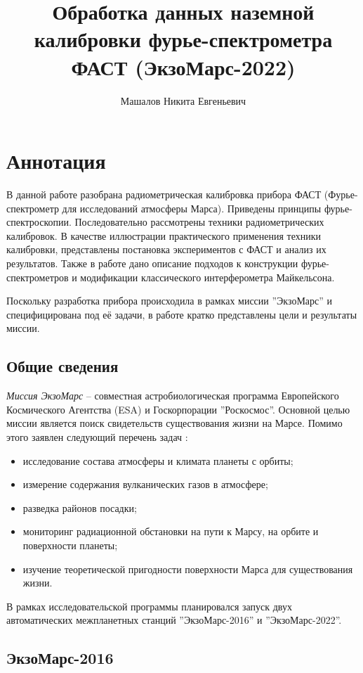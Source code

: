 \documentclass{mipt-thesis-bs}
\title{Обработка данных наземной калибровки фурье-спектрометра ФАСТ (ЭкзоМарс-2022)}
\author{Машалов Никита Евгеньевич}
\begin{document}
   
     

	\frontmatter
    \titlecontents
	\mainmatter

	\chapter{Аннотация}
	
	В данной работе разобрана радиометрическая калибровка прибора ФАСТ (Фурье-спектрометр для  исследований атмосферы Марса). Приведены принципы фурье-спектроскопии. Последовательно рассмотрены техники радиометрических калибровок. В качестве иллюстрации практического применения техники калибровки, представлены постановка экспериментов с ФАСТ и анализ их результатов. Также в работе дано описание подходов к конструкции фурье-спектрометров и модификации классического интерферометра Майкельсона.
	
	Поскольку разработка прибора происходила в рамках миссии ''ЭкзоМарс'' и специфицирована под её задачи, в работе кратко представлены цели и результаты миссии.
	
		\section{Общие сведения}
	\emph{Миссия ЭкзоМарс} – совместная астробиологическая программа Европейского Космического Агентства (ESA) и Госкорпорации ''Роскосмос''. Основной целью миссии является поиск свидетельств существования жизни на Марсе. Помимо этого заявлен следующий перечень задач \cite{vago2017habitability}:
	
		\begin{itemize}
		\item исследование состава атмосферы и климата планеты с орбиты;
		\item измерение содержания вулканических газов в атмосфере;
		\item разведка районов посадки;
		\item мониторинг радиационной обстановки на пути к Марсу, на орбите и поверхности планеты;
		\item изучение теоретической пригодности поверхности Марса для существования жизни.
	\end{itemize}
	
	В рамках исследовательской программы планировался запуск двух автоматических межпланетных станций ''ЭкзоМарс-2016'' и ''ЭкзоМарс-2022''.

	\section{ЭкзоМарс-2016}
	
\end{document}
